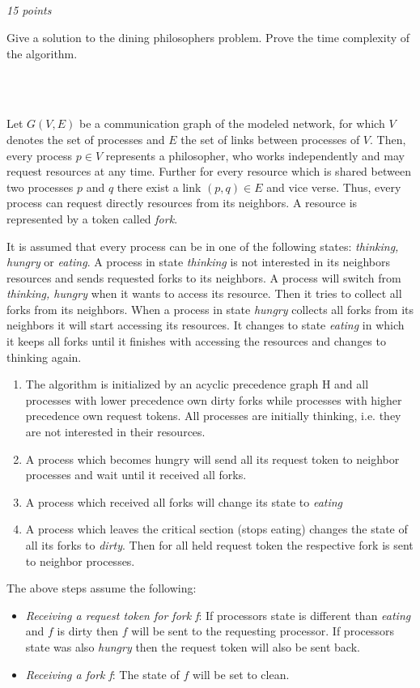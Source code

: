 \documentclass[a4paper]{article}
\newcommand{\points}[1]{\subsection{} \textit{#1 points}\\}
\newcommand{\question}[2][]{
  \parbox[t]{\textwidth}{
    \ifthenelse{\equal{#1}{}}{}{#1)}
    \parbox[t]{0.95\textwidth}{#2}}\\}
\begin{document}
\points{15}
\question{
  Give a solution to the dining philosophers problem. Prove the time
  complexity of the algorithm.
}\\
%
\begin{lrbox}{\userinput}
  \begin{minipage}{\linewidth}
    Let $G(V,E)$ be a communication graph of the modeled network, for
    which $V$ denotes the set of processes and $E$ the set of links
    between processes of $V$. Then, every process $p \in V$ represents a
    philosopher, who works independently and may request resources at any
    time. Further for every resource which is shared between two processes
    $p$ and $q$ there exist a link $(p,q) \in E$ and vice verse. Thus,
    every process can request directly resources from its neighbors. A
    resource is represented by a token called \textit{fork}.

    It is assumed that every process can be in one of the following
    states: \textit{thinking, hungry} or \textit{eating}. A process in
    state \textit{thinking} is not interested in its neighbors resources
    and sends requested forks to its neighbors. A process will switch from
    \textit{thinking, hungry} when it wants to access its resource. Then
    it tries to collect all forks from its neighbors. When a process in
    state \textit{hungry} collects all forks from its neighbors it will
    start accessing its resources.  It changes to state \textit{eating} in
    which it keeps all forks until it finishes with accessing the
    resources and changes to thinking again.
    \begin{enumerate}
      \item The algorithm is initialized by an acyclic precedence
        graph H and all processes with lower precedence own dirty forks while
        processes with higher precedence own request tokens. All processes are
        initially thinking, i.e. they are not interested in their resources.
      \item A process which becomes hungry will send all its request
        token to neighbor processes and wait until it received all forks.
      \item A process which received all forks will change its state
        to \textit{eating}
      \item A process which leaves the critical section (stops eating)
        changes the state of all its forks to \textit{dirty}. Then for all
        held request token the respective fork is sent to neighbor processes.
    \end{enumerate}
    The above steps assume the following:
    \begin{itemize}
      \item \textit{Receiving a request token for fork f}: If
        processors state is different than \textit{eating} and $f$ is dirty
        then $f$ will be sent to the requesting processor.  If processors
        state was also \textit{hungry} then the request token will also be
        sent back.
      \item \textit{Receiving a fork f}: The state of $f$ will be
        set to clean.
    \end{itemize}
  \end{minipage}
\end{lrbox}
\end{document}
